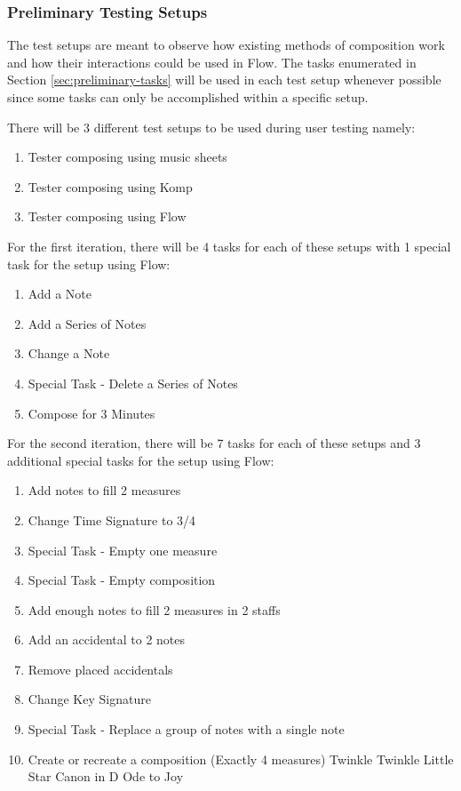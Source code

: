 \subsubsection{Preliminary Testing Setups}

The test setups are meant to observe how existing methods of composition work and how their interactions could be used in Flow. The tasks enumerated in Section \ref{sec:preliminary-tasks} will be used in each test setup whenever possible since some tasks can only be accomplished within a specific setup. 

There will be 3 different test setups to be used during user testing namely:

\begin{enumerate}
\item Tester composing using music sheets
\item Tester composing using Komp
\item Tester composing using Flow
\end{enumerate}

For the first iteration, there will be 4 tasks for each of these setups with 1 special task for the setup using Flow:

\begin{enumerate}
\item Add a Note
\item Add a Series of Notes
\item Change a Note
\item Special Task - Delete a Series of Notes
\item Compose for 3 Minutes
\end{enumerate}

For the second iteration, there will be 7 tasks for each of these setups and 3 additional special tasks for the setup using Flow:

\begin{enumerate}
\item Add notes to fill 2 measures
\item Change Time Signature to 3/4
\item Special Task - Empty one measure
\item Special Task - Empty composition
\item Add enough notes to fill 2 measures in 2 staffs
\item Add an accidental to 2 notes
\item Remove placed accidentals 
\item Change Key Signature
\item Special Task - Replace a group of notes with a single note
\item Create or recreate a composition (Exactly 4 measures)
\subitem Twinkle Twinkle Little Star
\subitem Canon in D
\subitem Ode to Joy 
\end{enumerate}




